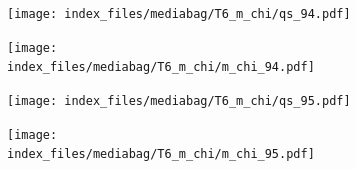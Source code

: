 \documentclass[
  11pt,
  letterpaper,
]{scrreprt}
\begin{document}
\begin{figure}

\begin{minipage}{0.50\linewidth}

\begin{figure}[H]

{\centering \texttt{[image: index\_files/mediabag/T6\_m\_chi/qs\_94.pdf]}

}


\end{figure}%

\end{minipage}%
%
\begin{minipage}{0.50\linewidth}

\begin{figure}[H]

{\centering \texttt{[image: index\_files/mediabag/T6\_m\_chi/m\_chi\_94.pdf]}

}


\end{figure}%

\end{minipage}%

\end{figure}%

\begin{figure}

\begin{minipage}{0.50\linewidth}

\begin{figure}[H]

{\centering \texttt{[image: index\_files/mediabag/T6\_m\_chi/qs\_95.pdf]}

}


\end{figure}%

\end{minipage}%
%
\begin{minipage}{0.50\linewidth}

\begin{figure}[H]

{\centering \texttt{[image: index\_files/mediabag/T6\_m\_chi/m\_chi\_95.pdf]}

}


\end{figure}%

\end{minipage}%

\end{figure}%
\end{document}
